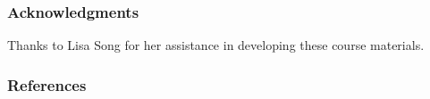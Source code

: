 \documentclass[11pt,aspectratio=169,hyperref={colorlinks}]{beamer}
\begin{document}
\begin{frame}[t]
	
	\frametitle{Acknowledgments}		
	
	Thanks to Lisa Song for her assistance in developing these course materials.\\
	
\end{frame}
		

	\begin{frame}[t, allowframebreaks]
	
		\frametitle{References}	
		
		\printbibliography
		
	\end{frame}
\end{document}

